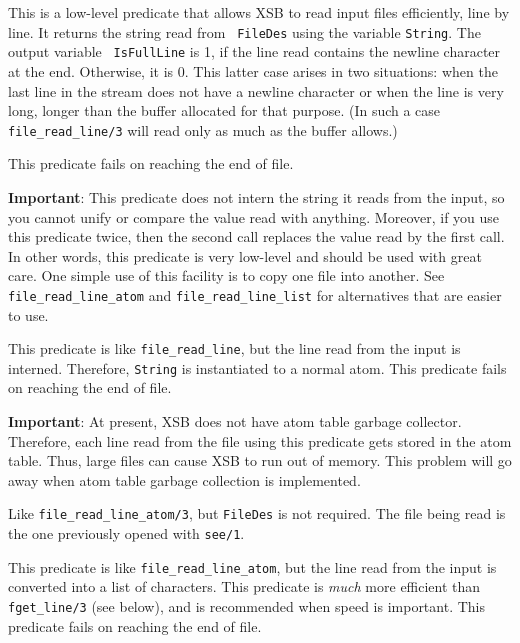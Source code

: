 \begin{description}
    This is a low-level predicate that allows XSB to read input files
    efficiently, line by line. It returns the string read from {\tt
      FileDes} using the variable {\tt String}. The output variable {\tt
      IsFullLine} is 1, if the line read contains the newline character at
    the end. Otherwise, it is 0. This latter case arises in two situations:
    when the last line in the stream does not have a newline  character or
    when the line is very long, longer than the buffer allocated for that
    purpose. (In such a case {\tt file\_read\_line/3} will read only as
    much as the buffer allows.) 

    This predicate fails on reaching the end of file.
    
    {\bf Important}: This predicate does not intern the string it reads
    from the input, so you cannot unify or compare the value read with
    anything. Moreover, if you use this predicate twice, then the second
    call replaces the value read by the first call. In other words, this
    predicate is very low-level and should be used with great care.
    One simple use of this facility is to copy one file into another.
    See \verb|file_read_line_atom| and \verb|file_read_line_list| for
    alternatives that are easier to use.

    This predicate is like \verb|file_read_line|, but the line read from
    the input is interned. Therefore, {\tt String} is instantiated
    to a normal atom. This predicate fails on reaching the end of file.
    
    {\bf Important}: At present, XSB does not have atom table garbage
    collector. Therefore, each line read from the file using this predicate
    gets stored in the atom table. Thus, large files can cause XSB to run
    out of memory.  This problem will go away when atom table garbage
    collection is implemented.

   Like \verb|file_read_line_atom/3|, but {\tt FileDes} is not required.
   The file being read is the one previously opened with {\tt see/1}.

    This predicate is like \verb|file_read_line_atom|, but the line read from
    the input is converted into a list of characters.
    This predicate is \emph{much} more efficient than {{\tt fget\_line/3}}
    (see below), and is recommended when speed is important.
    This predicate fails on reaching the end of file.


\end{description}
